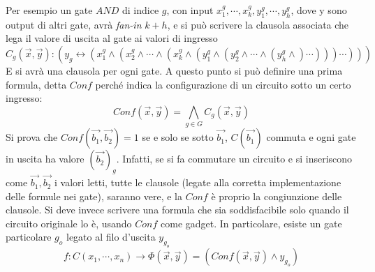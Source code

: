 Per esempio un gate $AND$ di indice $g$, con input $x_1^g, \cdots, x_k^g, y_1^g, \cdots, y_h^g$, dove y sono output di altri gate, avrà \emph{fan-in} $k+h$, e si può scrivere la clausola associata che lega il valore di uscita al gate ai valori di ingresso
\begin{equation*}
C_g \left( \vec{x}, \vec{y} \right) :
\left( y_g \leftrightarrow
    \left( x_1^g \wedge
        \left( x_2^g \wedge \cdots \wedge
            \left( x_k^g \wedge
                \left( y_1^g \wedge
                    \left( y_2^g \wedge \cdots \wedge
                        \left( y_h^g \wedge
                        \right)
                        \cdots
                    \right)
                \right)
            \right)
            \cdots
        \right)
    \right)
\right)
\end{equation*}
E si avrà una clausola per ogni gate. A questo punto si può definire una prima formula, detta $Conf$ perché indica la configurazione di un circuito sotto un certo ingresso:
\begin{equation*}
    Conf \left( \vec{x}, \vec{y} \right) =
    \bigwedge\limits_{g \in G}
    C_g \left( \vec{x}, \vec{y} \right)
\end{equation*}
Si prova che $ Conf ( \vec{b_1}, \vec{b_2} ) = 1 $ se e solo se sotto $\vec{b_1}$, $C( \vec{b_1} )$ commuta e ogni gate in uscita ha valore $( \vec{b_2} )_g$. Infatti, se si fa commutare un circuito e si inseriscono come $\vec{b_1}, \vec{b_2}$ i valori letti, tutte le clausole (legate alla corretta implementazione delle formule nei gate), saranno vere, e la $Conf$ è proprio la congiunzione delle clausole.
Si deve invece scrivere una formula che sia soddisfacibile solo quando il circuito originale lo è, usando $Conf$ come gadget. In particolare, esiste un gate particolare $g_o$ legato al filo d'uscita $y_{g_o}$
\begin{equation*}
    f:
    C \left( x_1, \cdots, x_n \right)
    \to
    \Phi \left( \vec{x}, \vec{y} \right) =
    \left( 
    Conf \left( \vec{x}, \vec{y} \right) \wedge y_{g_o}
    \right)
\end{equation*}

